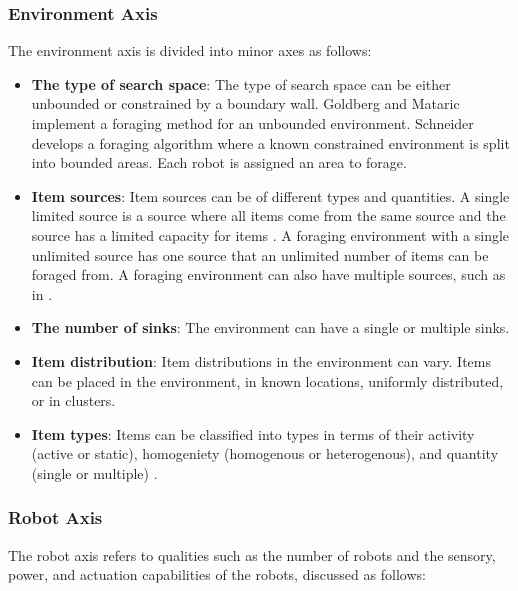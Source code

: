 \subsubsection{Environment Axis}
\label{environmentaxis}
The environment axis is divided into minor axes as follows:
\begin{itemize}
\item \textbf{The type of search space}: The type of search space can be either unbounded or constrained by a boundary wall. Goldberg and Mataric \cite{Goldberg01designand} implement a foraging method for an unbounded environment. Schneider \cite{schneider1998territorial} develops a foraging algorithm where a known constrained environment is split into bounded areas. Each robot is assigned an area to forage.

\item \textbf{Item sources}: Item sources can be of different types and quantities. A single limited source is a source where all items come from the same source and the source has a limited capacity for items \cite{sugawara2002swarming}. A foraging environment with a single unlimited source has one source that an unlimited number of items can be foraged from. A foraging environment can also have multiple sources, such as in \cite{Goldberg01designand}. 

\item \textbf{The number of sinks}: The environment can have a single or multiple sinks. 

\item \textbf{Item distribution}: Item distributions in the environment can vary. Items can be placed  in the environment, in known locations, uniformly distributed, or in clusters.

\item \textbf{Item types}: Items can be classified into types in terms of their activity (active or static), homogeniety (homogenous or heterogenous), and quantity (single or multiple) \cite{Balch99rewardand,
 campo2007efficient, jones2003adaptive}.

\end{itemize}

\subsubsection{Robot Axis}

The robot axis refers to qualities such as the number of robots and the sensory, power, and actuation capabilities of the robots, discussed as follows:

